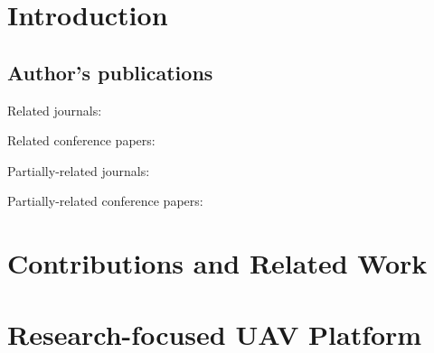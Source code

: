 \documentclass[a4paper,11pt,titlepage,twoside]{book}
\newcommand{\chapternoclear}[1]{
  \begingroup
  \let\cleardoublepage\clearpage
  \chapter{#1}
  \endgroup
}
\newcommand{\conditionalClearPage}{
  \ifdefined\printversion
  \clearemptydoublepage
  \else
  \newpage{}
  \clearpage
  \fi
}
\begin{document}


\conditionalClearPage


\conditionalClearPage


\conditionalClearPage


\pagestyle{fancy}

\conditionalClearPage
\tableofcontents



\chapternoclear{Introduction}


\section{Author's publications}

Related journals:
\cite{baca2018rospix}
\cite{baca2019autonomous}
\cite{spurny2019cooperative}
\cite{saska2017system}
\cite{giernacki2019realtime}
\cite{chudoba2016exploration}
\cite{saska2020formation}
\cite{loianno2018localization}
\cite{petrlik2020robust}
\cite{stibinger2020localization}
\cite{saikin2020wildfire}
\cite{baca2020mrs}

Related conference papers:
\cite{baca2019timepix}
\cite{baca2018model}
\cite{baca2016embedded}
\cite{baca2017autonomous}
\cite{saska2017documentation}
\cite{spurny2016complex}
\cite{faigl2017onsolution}
\cite{saska2016formations}
\cite{roucek2019darpa}

Partially-related journals:
\cite{baca2016miniaturized}
\cite{baca2018timepix}
\cite{daniel2019inorbit}
\cite{urban2017vzlusat}

Partially-related conference papers:
\cite{daniel2016terrestrial}
\cite{daniel2017xray}





\chapternoclear{Contributions and Related Work}




\chapternoclear{Research-focused UAV Platform}
\end{document}
